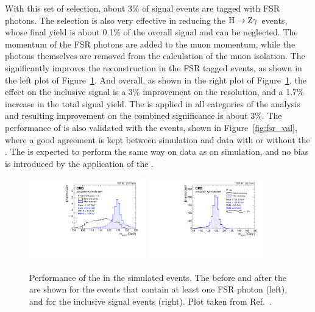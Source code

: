 With this set of selection, about 3\% of signal events are tagged with FSR photons.
The selection is also very effective in reducing the $\mathrm{H} \to \mathrm{Z}\gamma$ events,
whose final yield is about 0.1\% of the overall \hmm signal and can be neglected.
The momentum of the FSR photons are added to the muon momentum, 
while the photons themselves are removed from the calculation of the muon isolation.
The \FSR significantly improves the \mmm reconstruction in the FSR tagged events, as shown in the left plot of Figure~\ref{fig:fsr_sig}.
And overall, as shown in the right plot of Figure~\ref{fig:fsr_sig}, the effect on the inclusive signal is a 3\% improvement on the \mmm resolution, 
and a 1.7\% increase in the total signal yield. 
The \FSR is applied in all categories of the \hmm analysis and resulting improvement on the combined significance is about 3\%.
The performance of \FSR is also validated with the \zmm events, shown in Figure~\ref{fig:fsr_val},
where a good agreement is kept between simulation and data with or without the \FSR. 
The \FSR is expected to perform the same way on data as on simulation, 
and no bias is introduced by the application of the \FSR. 

\begin{figure}[!htb]
      \centering
      \captionsetup{justification=justified}
      \includegraphics[width=0.45\textwidth]{pics/muon_corr/FSR/FSRrecovery_FSRtagged.pdf}
      \includegraphics[width=0.45\textwidth]{pics/muon_corr/FSR/FSRrecovery_FullSignal.pdf}
      \caption{Performance of the \FSR in the simulated \hmm events. 
               The \mmm before and after the \FSR are shown for the events that contain at least one FSR photon (left),
               and for the inclusive signal events (right).
               Plot taken from Ref.~\cite{oliverthesis}.}
      \label{fig:fsr_sig}
\end{figure}


